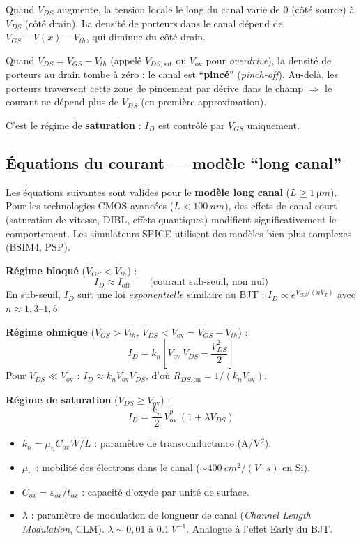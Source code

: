 \documentclass[12pt,a4paper,twoside]{book}
\begin{document}
Quand $V_{DS}$ augmente, la tension locale le long du canal varie de $0$ (côté source) à $V_{DS}$ (côté drain). La densité de porteurs dans le canal dépend de $V_{GS} - V(x) - V_{th}$, qui diminue du côté drain.

\begin{formule}
Quand $V_{DS} = V_{GS} - V_{th}$ (appelé $V_{DS,\text{sat}}$ ou $V_{\text{ov}}$ pour \textit{overdrive}), la densité de porteurs au drain tombe à zéro : le canal est ``\textbf{pincé}'' (\textit{pinch-off}). Au-delà, les porteurs traversent cette zone de pincement par dérive dans le champ $\Rightarrow$ le courant ne dépend plus de $V_{DS}$ (en première approximation).

C'est le régime de \textbf{saturation} : $I_D$ est contrôlé par $V_{GS}$ uniquement.
\end{formule}

\subsection{Équations du courant --- modèle ``long canal''}

\begin{attention}
Les équations suivantes sont valides pour le \textbf{modèle long canal} ($L \geq \SI{1}{\micro m}$). Pour les technologies CMOS avancées ($L < \SI{100}{nm}$), des effets de canal court (saturation de vitesse, DIBL, effets quantiques) modifient significativement le comportement. Les simulateurs SPICE utilisent des modèles bien plus complexes (BSIM4, PSP).
\end{attention}

\begin{formule}
\textbf{Régime bloqué} ($V_{GS} < V_{th}$) :
\[
I_D \approx I_{\text{off}} \qquad \text{(courant sub-seuil, non nul)}
\]
En sub-seuil, $I_D$ suit une loi \textit{exponentielle} similaire au BJT : $I_D \propto e^{V_{GS}/(nV_T)}$ avec $n \approx 1{,}3$--$1{,}5$.

\textbf{Régime ohmique} ($V_{GS} > V_{th}$, $V_{DS} < V_{\text{ov}} = V_{GS}-V_{th}$) :
\[
\boxed{I_D = k_n\left[V_{\text{ov}}\,V_{DS} - \frac{V_{DS}^2}{2}\right]}
\]
Pour $V_{DS} \ll V_{\text{ov}}$ : $I_D \approx k_n V_{\text{ov}} V_{DS}$, d'où $R_{DS,\text{on}} = 1/(k_n V_{\text{ov}})$.

\textbf{Régime de saturation} ($V_{DS} \geq V_{\text{ov}}$) :
\[
\boxed{I_D = \frac{k_n}{2}\,V_{\text{ov}}^2\,(1 + \lambda V_{DS})}
\]
\begin{itemize}[nosep]
\item $k_n = \mu_n C_{ox} W/L$ : paramètre de transconductance (A/V$^2$).
\item $\mu_n$ : mobilité des électrons dans le canal ($\sim\SI{400}{cm^2/(V\cdot s)}$ en Si).
\item $C_{ox} = \varepsilon_{ox}/t_{ox}$ : capacité d'oxyde par unité de surface.
\item $\lambda$ : paramètre de modulation de longueur de canal (\textit{Channel Length Modulation}, CLM). $\lambda \sim 0{,}01$ à $\SI{0.1}{V^{-1}}$. Analogue à l'effet Early du BJT.
\end{itemize}
\end{formule}
\end{document}
